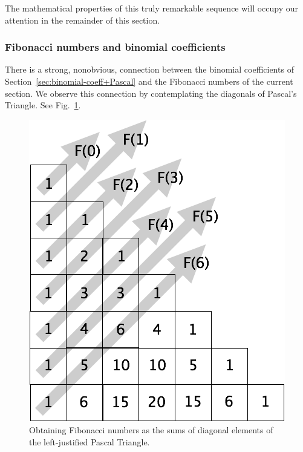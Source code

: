 The mathematical properties of this truly remarkable sequence will
occupy our attention in the remainder of this section.


\subsubsection{Fibonacci numbers and binomial coefficients}
\label{sec:FibNo+BinomCoeff}


There is a strong, nonobvious, connection between the binomial
coefficients of Section~\ref{sec:binomial-coeff+Pascal} and the
Fibonacci numbers of the current section.  We observe this connection
by contemplating the diagonals of Pascal's Triangle.  See
Fig.~\ref{fig:FiboPascal}.
\begin{figure}[htb]
\begin{center}
        \includegraphics[scale=0.3]{FiguresMaths//FiboPascal1}
\caption{Obtaining Fibonacci numbers as the sums of diagonal elements of the left-justified Pascal Triangle.}
\label{fig:FiboPascal}
\end{center}
\end{figure}

